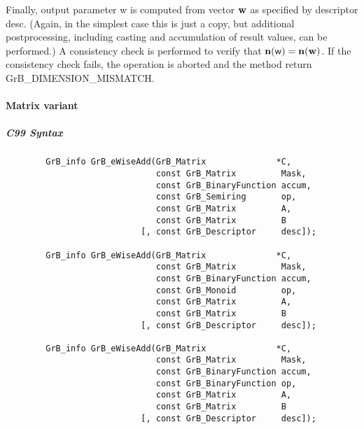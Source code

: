 Finally, output parameter {\sf w} is computed from vector ${\bf w}$
as specified by descriptor {\sf desc}. (Again, in the simplest case this
is just a copy, but additional postprocessing, including casting and
accumulation of result values, can be performed.)  A consistency check is
performed to verify that $\bold{n}({\sf w}) = \bold{n}({\bf w})$. If
the consistency check fails, the operation is aborted and the method
return {\sf GrB\_DIMENSION\_MISMATCH}.


\paragraph{Matrix variant}


\subparagraph{C99 Syntax}

\begin{verbatim}
        GrB_info GrB_eWiseAdd(GrB_Matrix              *C,
                              const GrB_Matrix         Mask,
                              const GrB_BinaryFunction accum,
                              const GrB_Semiring       op, 
                              const GrB_Matrix         A,
                              const GrB_Matrix         B
                           [, const GrB_Descriptor     desc]);
                            
        GrB_info GrB_eWiseAdd(GrB_Matrix              *C,
                              const GrB_Matrix         Mask,
                              const GrB_BinaryFunction accum,
                              const GrB_Monoid         op, 
                              const GrB_Matrix         A,
                              const GrB_Matrix         B
                           [, const GrB_Descriptor     desc]);
                            
        GrB_info GrB_eWiseAdd(GrB_Matrix              *C,
                              const GrB_Matrix         Mask,
                              const GrB_BinaryFunction accum,
                              const GrB_BinaryFunction op, 
                              const GrB_Matrix         A,
                              const GrB_Matrix         B
                           [, const GrB_Descriptor     desc]);
\end{verbatim}

